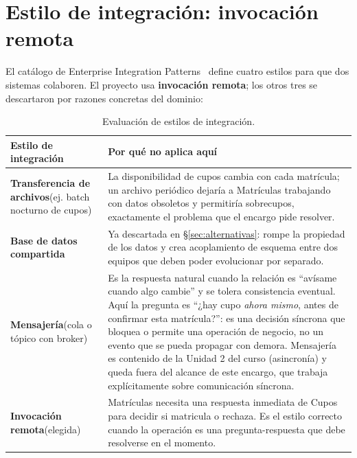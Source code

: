 \documentclass[11pt,spanish]{article}
\begin{document}
\section{Estilo de integración: invocación remota}

El catálogo de Enterprise Integration Patterns~\cite{eip} define cuatro estilos para que dos sistemas colaboren. El proyecto usa \textbf{invocación remota}; los otros tres se descartaron por razones concretas del dominio:

\begin{table}[H]
\centering
\small
\begin{tabularx}{\textwidth}{p{4.2cm} X}
\toprule
\textbf{Estilo de integración} & \textbf{Por qué no aplica aquí} \\
\midrule
\textbf{Transferencia de archivos}\newline (ej. batch nocturno de cupos) & La disponibilidad de cupos cambia con cada matrícula; un archivo periódico dejaría a Matrículas trabajando con datos obsoletos y permitiría sobrecupos, exactamente el problema que el encargo pide resolver. \\
\addlinespace
\textbf{Base de datos compartida} & Ya descartada en \S\ref{sec:alternativas}: rompe la propiedad de los datos y crea acoplamiento de esquema entre dos equipos que deben poder evolucionar por separado. \\
\addlinespace
\textbf{Mensajería}\newline (cola o tópico con broker) & Es la respuesta natural cuando la relación es ``avísame cuando algo cambie'' y se tolera consistencia eventual. Aquí la pregunta es ``¿hay cupo \textit{ahora mismo}, antes de confirmar esta matrícula?'': es una decisión síncrona que bloquea o permite una operación de negocio, no un evento que se pueda propagar con demora. Mensajería es contenido de la Unidad 2 del curso (asincronía) y queda fuera del alcance de este encargo, que trabaja explícitamente sobre comunicación síncrona. \\
\addlinespace
\textbf{Invocación remota}\newline (elegida) & Matrículas necesita una respuesta inmediata de Cupos para decidir si matricula o rechaza. Es el estilo correcto cuando la operación es una pregunta-respuesta que debe resolverse en el momento. \\
\bottomrule
\end{tabularx}
\caption{Evaluación de estilos de integración.}
\end{table}
\end{document}
